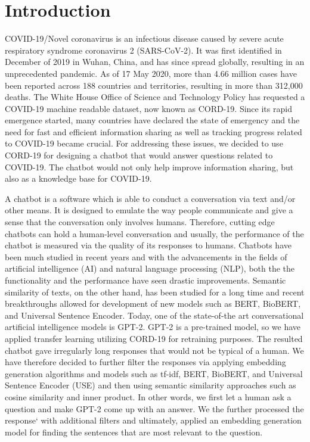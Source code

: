 \documentclass[sigconf,natbib=false]{acmart}
\begin{document}
\section{Introduction}

COVID-19/Novel coronavirus is an infectious disease caused by severe acute
respiratory syndrome coronavirus 2 (SARS-CoV-2). It was first identified in
December of 2019 in Wuhan, China, and has since spread globally, resulting in
an unprecedented pandemic. As of 17 May 2020, more than 4.66 million cases have
been reported across 188 countries and territories, resulting in more than
312,000 deaths. The White House Office of Science and Technology Policy has
requested a COVID-19 machine readable dataset, now known as CORD-19. Since its
rapid emergence started, many countries have declared the state of emergency
and the need for fast and efficient information sharing as well as tracking
progress related to COVID-19 became crucial. For addressing these issues, we
decided to use CORD-19 for designing a chatbot that would answer questions
related to COVID-19. The chatbot would not only help improve information
sharing, but also as a knowledge base for COVID-19.

\bigskip

\noindent A chatbot is a software which is able to conduct a conversation via
text and/or other means. It is designed to emulate the way people communicate
and give a sense that the conversation only involves humans. Therefore, cutting
edge chatbots can hold a human-level conversation and usually, the performance
of the chatbot is measured via the quality of its responses to humans. Chatbots
have been much studied in recent years and with the advancements in the fields
of artificial intelligence (AI) and natural language processing (NLP), both the the
functionality and the performance have seen drastic improvements. Semantic
similarity of texts, on the other hand, has been studied for a long time and
recent breakthroughs allowed for development of new models such as BERT,
BioBERT, and Universal Sentence Encoder. Today, one of the state-of-the art
conversational artificial intelligence models is GPT-2. GPT-2 is a pre-trained
model, so we have applied transfer learning utilizing CORD-19 for retraining
purposes. The resulted chatbot gave irregularly long responses that would not
be typical of a human. We have therefore decided to further filter the
responses via applying embedding generation algorithms and models such as
tf-idf, BERT, BioBERT, and Universal Sentence Encoder (USE) and then using
semantic similarity approaches such as cosine similarity and inner product. In
other words, we first let a human ask a question and make GPT-2 come up with an
answer. We the further processed the response` with additional filters and
ultimately, applied an embedding generation model for finding the sentences
that are most relevant to the question.
\end{document}
